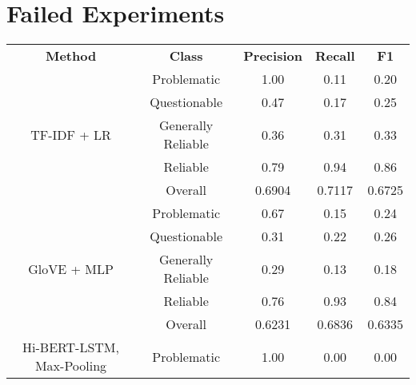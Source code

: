 \section{Failed Experiments}

\begin{table}[htbp]
    \centering
    \scriptsize
    \begin{longtable}{| c | c | c | c | c |}
        \hline                            \textbf{Method}     & \textbf{Class}     & \textbf{Precision} & \textbf{Recall} & \textbf{F1} \\\cline{1-5}
        \multirow{5}{*}{TF-IDF + LR}                          & Problematic        & 1.00               & 0.11            & 0.20        \\
                                                              & Questionable       & 0.47               & 0.17            & 0.25        \\
                                                              & Generally Reliable & 0.36               & 0.31            & 0.33        \\
                                                              & Reliable           & 0.79               & 0.94            & 0.86        \\\cline{2-5}
                                                              & Overall            & 0.6904             & 0.7117          & 0.6725      \\
        \hline
        \multirow{5}{*}{GloVE + MLP}                          & Problematic        & 0.67               & 0.15            & 0.24        \\
                                                              & Questionable       & 0.31               & 0.22            & 0.26        \\
                                                              & Generally Reliable & 0.29               & 0.13            & 0.18        \\
                                                              & Reliable           & 0.76               & 0.93            & 0.84        \\\cline{2-5}
                                                              & Overall            & 0.6231             & 0.6836          & 0.6335      \\
        \hline
        \multirow{5}{*}{Hi-BERT-LSTM, Max-Pooling}            & Problematic        & 1.00               & 0.00            & 0.00        \\

\end{longtable}
\end{table}
